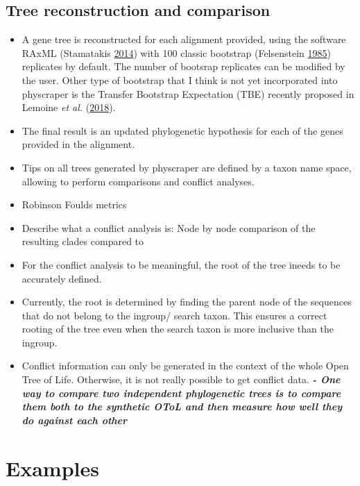 \documentclass[]{article}
\providecommand{\tightlist}{%
  \setlength{\itemsep}{0pt}\setlength{\parskip}{0pt}}
\begin{document}
\hypertarget{tree-reconstruction-and-comparison}{%
\subsection{Tree reconstruction and comparison}\label{tree-reconstruction-and-comparison}}

\begin{itemize}
\tightlist
\item
  A gene tree is reconstructed for each alignment provided, using the software RAxML (Stamatakis \protect\hyperlink{ref-stamatakis2014raxml}{2014})
  with 100 classic bootstrap (Felsenstein \protect\hyperlink{ref-felsenstein1985confidence}{1985}) replicates by default. The number of bootsrap replicates can be modified by the user.
  Other type of bootstrap that I think is not yet incorporated into physcraper is the Transfer Bootstrap Expectation (TBE) recently proposed in Lemoine \emph{et al.} (\protect\hyperlink{ref-lemoine2018renewing}{2018}).
\item
  The final result is an updated phylogenetic hypothesis for each of the genes provided in the alignment.
\item
  Tips on all trees generated by physcraper are defined by a taxon name space, allowing to perform comparisons and conflict analyses.
\item
  Robinson Foulds metrics
\item
  Describe what a conflict analysis is: Node by node comparison of the resulting clades compared to
\item
  For the conflict analysis to be meaningful, the root of the tree ineeds to be accurately defined.
\item
  Currently, the root is determined by finding the parent node of the sequences that do not belong to the ingroup/ search taxon. This ensures a correct rooting of the tree even when the search taxon is more inclusive than the ingroup.
\item
  Conflict information can only be generated in the context of the whole Open Tree of
  Life. Otherwise, it is not really possible to get conflict data.
  \textbf{\emph{- One way to compare two independent phylogenetic trees is to compare them both to
  the synthetic OToL and then measure how well they do against each other}}
\end{itemize}

\hypertarget{examples}{%
\section{Examples}\label{examples}}
\end{document}
